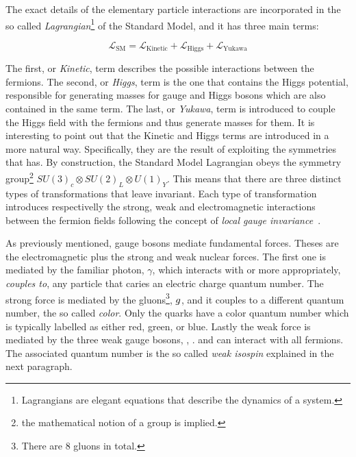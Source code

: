 The exact details of the elementary particle interactions are incorporated in the so called
{\it Lagrangian}\footnote{ Lagrangians are elegant equations that describe the dynamics of a system.} of the Standard Model,
and it has three main terms:

\begin{equation}
\mathscr{L}_{\text{SM}} =
\mathscr{L}_{\text{Kinetic}} + \mathscr{L}_{\text{Higgs}} + \mathscr{L}_{\text{Yukawa}}
\label{lagrangian}
\end{equation}

\noindent The first, or {\it Kinetic}, term describes the possible interactions between the fermions.
The second, or {\it Higgs}, term is the one that contains the Higgs potential, responsible for generating
masses for gauge and Higgs bosons which are also contained in the same term.
The last, or {\it Yukawa}, term is introduced to couple the Higgs field with the fermions and thus generate masses for them.
It is interesting to point out that the Kinetic and Higgs terms are introduced in a more natural way.
Specifically, they are the result of exploiting the symmetries that  has.
By construction, the Standard Model Lagrangian obeys the symmetry group\footnote{the mathematical notion of a group is implied.}
$SU(3)_c\otimes SU(2)_L\otimes U(1)_Y$. This means that there are three distinct types of transformations
that leave  invariant. Each type of transformation introduces respectivelly the strong,
weak and electromagnetic interactions between the fermion fields following the concept of {\it local gauge invariance}~\cite{aitchison,halzen1984quarks}.

As previously mentioned, gauge bosons mediate fundamental forces. Theses are the electromagnetic plus the strong and weak nuclear forces.
The first one is mediated by the familiar photon, $\gamma$, which interacts with or more appropriately, {\it couples to}, any particle that
caries an electric charge quantum number. The strong force is mediated by the gluons\footnote{There are 8 gluons in total.}, $g$,
and it couples to a different quantum number, the so called {\it color}.
Only the quarks have a color quantum number which is typically labelled as either red, green, or blue. Lastly the
weak force is mediated by the three weak gauge bosons, \Wpm, \Z. and can interact with all fermions. The associated quantum number is
the so called {\it weak isospin} explained in the next paragraph.

